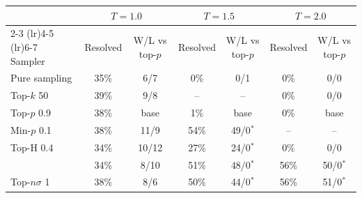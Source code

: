 \begin{tabular}{lcccccc}
\toprule
 & \multicolumn{2}{c}{$T{=}1.0$} & \multicolumn{2}{c}{$T{=}1.5$} & \multicolumn{2}{c}{$T{=}2.0$} \\
\cmidrule(lr){2-3} \cmidrule(lr){4-5} \cmidrule(lr){6-7}
Sampler & Resolved & W/L vs top-$p$ & Resolved & W/L vs top-$p$ & Resolved & W/L vs top-$p$ \\
\midrule
Pure sampling & 35\% & 6/7 & 0\% & 0/1 & 0\% & 0/0 \\
Top-$k$ 50 & 39\% & 9/8 & -- & -- & 0\% & 0/0 \\
Top-$p$ 0.9 & 38\% & base & 1\% & base & 0\% & base \\
Min-$p$ 0.1 & 38\% & 11/9 & 54\% & 49/0$^{*}$ & -- & -- \\
Top-H 0.4 & 34\% & 10/12 & 27\% & 24/0$^{*}$ & 0\% & 0/0 \\
\pless{} & 34\% & 8/10 & 51\% & 48/0$^{*}$ & 56\% & 50/0$^{*}$ \\
Top-$n\sigma$ 1 & 38\% & 8/6 & 50\% & 44/0$^{*}$ & 56\% & 51/0$^{*}$ \\
\bottomrule
\end{tabular}
